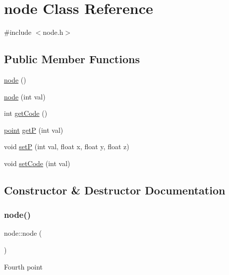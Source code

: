 \hypertarget{classnode}{}\section{node Class Reference}
\label{classnode}


{\ttfamily \#include $<$node.\+h$>$}

\subsection*{Public Member Functions}
\begin{DoxyCompactItemize}
\item 
\hyperlink{classnode_a82669b7358b50bd8d7888d7df4ff8dfa}{node} ()
\item 
\hyperlink{classnode_a2ca0f22227e401688f42ad27f55f9dfb}{node} (int val)
\item 
int \hyperlink{classnode_a220ab653a04346fc295f1386990410f8}{get\+Code} ()
\item 
\hyperlink{classpoint}{point} \hyperlink{classnode_a74ad6cbf02b30778e4e2391accfb9e7a}{getP} (int val)
\item 
void \hyperlink{classnode_ac96d4f650585e36edc26172d7f76bea9}{setP} (int val, float x, float y, float z)
\item 
void \hyperlink{classnode_a372a737c7109c11192ee2183c038ce8f}{set\+Code} (int val)
\end{DoxyCompactItemize}


\subsection{Constructor \& Destructor Documentation}
\mbox{\label{classnode_a82669b7358b50bd8d7888d7df4ff8dfa}} 
\subsubsection{\texorpdfstring{node()}{node()}\hspace{0.1cm}{\footnotesize\ttfamily [1/2]}}
{\footnotesize\ttfamily node\+::node (\begin{DoxyParamCaption}{ }\end{DoxyParamCaption})\hspace{0.3cm}{\ttfamily [inline]}}

Fourth point \mbox{\label{classnode_a2ca0f22227e401688f42ad27f55f9dfb}} 
